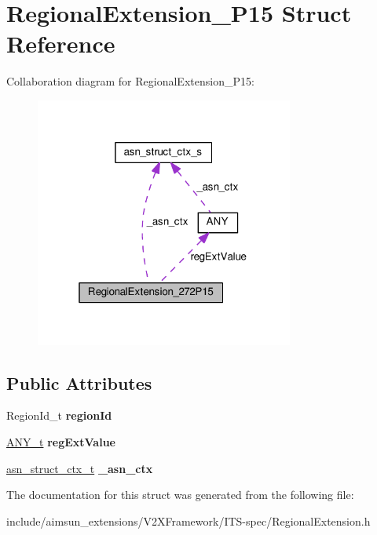 \hypertarget{structRegionalExtension__272P15}{}\section{Regional\+Extension\+\_\+P15 Struct Reference}
\label{structRegionalExtension__272P15}


Collaboration diagram for Regional\+Extension\+\_\+P15\+:\nopagebreak
\begin{figure}[H]
\begin{center}
\leavevmode
\includegraphics[width=241pt]{structRegionalExtension__272P15__coll__graph}
\end{center}
\end{figure}
\subsection*{Public Attributes}
\begin{DoxyCompactItemize}
\item 
Region\+Id\+\_\+t {\bfseries region\+Id}\hypertarget{structRegionalExtension__272P15_af336d488eddcc208819428a6dfefff45}{}\label{structRegionalExtension__272P15_af336d488eddcc208819428a6dfefff45}

\item 
\hyperlink{structANY}{A\+N\+Y\+\_\+t} {\bfseries reg\+Ext\+Value}\hypertarget{structRegionalExtension__272P15_a9114cee7532b1c3c3de0944426ec4355}{}\label{structRegionalExtension__272P15_a9114cee7532b1c3c3de0944426ec4355}

\item 
\hyperlink{structasn__struct__ctx__s}{asn\+\_\+struct\+\_\+ctx\+\_\+t} {\bfseries \+\_\+asn\+\_\+ctx}\hypertarget{structRegionalExtension__272P15_a9c245c4ac091fc50c89db636fb7419fa}{}\label{structRegionalExtension__272P15_a9c245c4ac091fc50c89db636fb7419fa}

\end{DoxyCompactItemize}


The documentation for this struct was generated from the following file\+:\begin{DoxyCompactItemize}
\item 
include/aimsun\+\_\+extensions/\+V2\+X\+Framework/\+I\+T\+S-\/spec/Regional\+Extension.\+h\end{DoxyCompactItemize}
